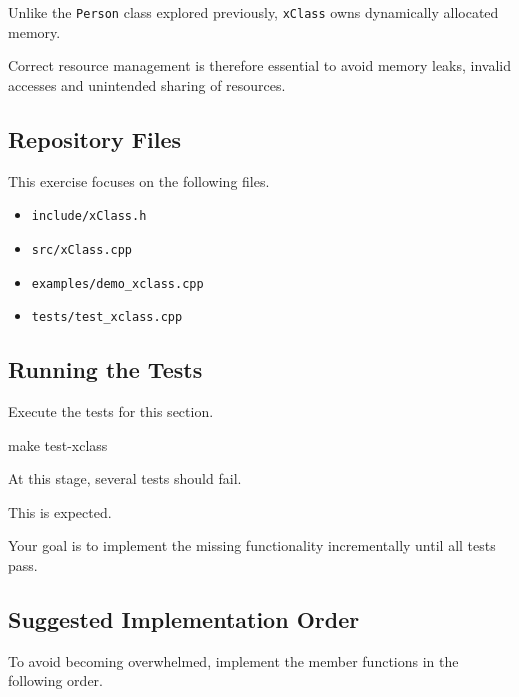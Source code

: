 \documentclass{csc2059practical}
\begin{document}
Unlike the \texttt{Person} class explored previously,
\texttt{xClass} owns dynamically allocated memory.

Correct resource management is therefore essential to avoid memory leaks,
invalid accesses and unintended sharing of resources.

\subsection*{Repository Files}

This exercise focuses on the following files.

\begin{itemize}

\item \texttt{include/xClass.h}

\item \texttt{src/xClass.cpp}

\item \texttt{examples/demo\_xclass.cpp}

\item \texttt{tests/test\_xclass.cpp}

\end{itemize}

\subsection*{Running the Tests}

Execute the tests for this section.

\begin{terminal}
make test-xclass
\end{terminal}

At this stage, several tests should fail.

This is expected.

Your goal is to implement the missing functionality incrementally until
all tests pass.

\subsection*{Suggested Implementation Order}

To avoid becoming overwhelmed, implement the member functions in the
following order.
\end{document}
